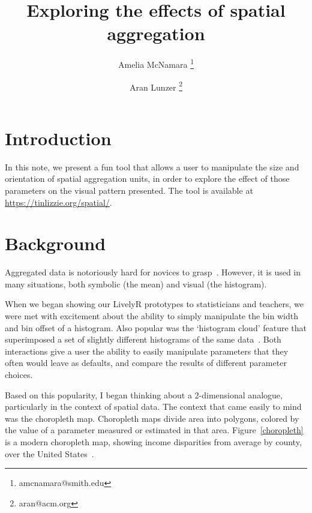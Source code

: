 \documentclass{article}\usepackage[]{graphicx}\usepackage[]{color}
\begin{document}
\title{Exploring the effects of spatial aggregation}
\author[1,2]{Amelia McNamara%
\thanks{amcnamara@smith.edu}}
\author[1,3]{Aran Lunzer%
\thanks{aran@acm.org}}

\maketitle

\section{Introduction}
In this note, we present a fun tool that allows a user to manipulate the size and orientation of spatial aggregation units, in order to explore the effect of those parameters on the visual pattern presented. The tool is available at \url{https://tinlizzie.org/spatial/}. 

\section{Background}
Aggregated data is notoriously hard for novices to grasp~\citep{KonHigRus2014, HanKap1992}. However, it is used in many situations, both symbolic (the mean) and visual (the histogram). 

When we began showing our LivelyR prototypes to statisticians and teachers, we were met with excitement about the ability to simply manipulate the bin width and bin offset of a histogram. Also popular was the `histogram cloud' feature that superimposed a set of slightly different histograms of the same data~\citep{McN2015b}. Both interactions give a user the ability to easily manipulate parameters that they often would leave as defaults, and compare the results of different parameter choices. 

Based on this popularity, I began thinking about a 2-dimensional analogue, particularly in the context of spatial data. The context that came easily to mind was the choropleth map. Choropleth maps divide area into polygons, colored by the value of a parameter measured or estimated in that area. Figure~\ref{choropleth} is a modern choropleth map, showing income disparities from average by county, over the United States~\citep{AisBut2015}. 
\end{document}
